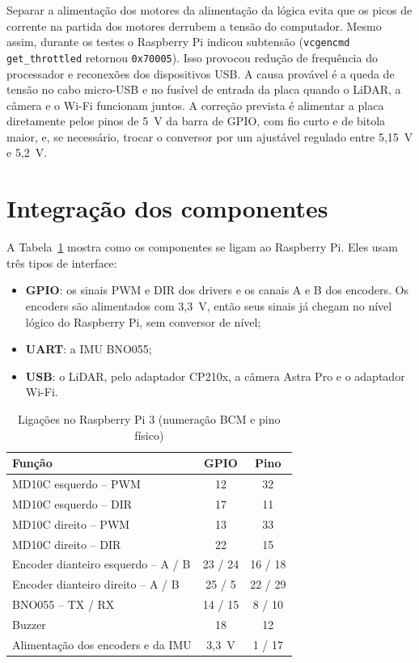 Separar a alimentação dos motores da alimentação da lógica evita que os
picos de corrente na partida dos motores derrubem a tensão do computador.
Mesmo assim, durante os testes o Raspberry Pi indicou subtensão
(\texttt{vcgencmd get\_throttled} retornou \texttt{0x70005}). Isso
provocou redução de frequência do processador e reconexões dos
dispositivos USB. A causa provável é a queda de tensão no cabo micro-USB
e no fusível de entrada da placa quando o LiDAR, a câmera e o Wi-Fi
funcionam juntos. A correção prevista é alimentar a placa diretamente
pelos pinos de 5~V da barra de GPIO, com fio curto e de bitola maior, e,
se necessário, trocar o conversor por um ajustável regulado entre 5,15~V
e 5,2~V. %

\section{Integração dos componentes}
\label{sec:integracao-hw}

A Tabela~\ref{tab:pinagem} mostra como os
componentes se ligam ao Raspberry Pi. Eles usam três tipos de interface:

\begin{itemize}
	\item \textbf{GPIO}: os sinais PWM e DIR dos drivers e os canais A e B
	dos encoders. Os encoders são alimentados com 3,3~V, então seus sinais
	já chegam no nível lógico do Raspberry Pi, sem conversor de nível;
	\item \textbf{UART}: a IMU BNO055;
	\item \textbf{USB}: o LiDAR, pelo adaptador CP210x, a câmera Astra Pro
	e o adaptador Wi-Fi.
\end{itemize}

\begin{table}[htb]
	\centering
	\caption{Ligações no Raspberry Pi 3 (numeração BCM e pino físico)}
	\label{tab:pinagem}
	\begin{tabular}{|l|c|c|}
		\hline
		\textbf{Função} & \textbf{GPIO} & \textbf{Pino} \\ \hline
		MD10C esquerdo -- PWM & 12 & 32 \\ \hline
		MD10C esquerdo -- DIR & 17 & 11 \\ \hline
		MD10C direito -- PWM & 13 & 33 \\ \hline
		MD10C direito -- DIR & 22 & 15 \\ \hline
		Encoder dianteiro esquerdo -- A / B & 23 / 24 & 16 / 18 \\ \hline
		Encoder dianteiro direito -- A / B & 25 / 5 & 22 / 29 \\ \hline
		BNO055 -- TX / RX & 14 / 15 & 8 / 10 \\ \hline
		Buzzer & 18 & 12 \\ \hline
		Alimentação dos encoders e da IMU & 3,3~V & 1 / 17 \\ \hline
	\end{tabular}
\end{table}

